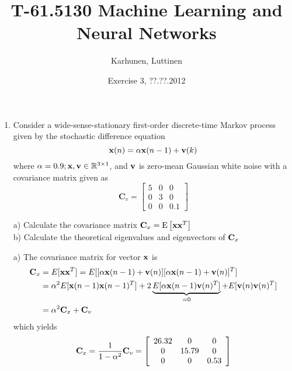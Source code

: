 
\title{T-61.5130 Machine Learning and Neural Networks}
\author{Karhunen, Luttinen}
\date{Exercise 3, ??.??.2012}





\maketitle

\begin{enumerate}
  
\item Consider a wide-sense-stationary
  first-order discrete-time Markov process given by the stochastic
  difference equation
  \[
  {\bf x}(n) = \alpha {\bf x}(n-1) + {\bf v}(k)
  \]
  where $\alpha = 0.9; {\bf x}, {\bf v} \in \mathbb{R}^{3\times 1}$,
  and ${\bf v}$ is zero-mean Gaussian white noise with a covariance
  matrix given as
  \[ \textbf{C}_v = \left[ \begin{array}{ccc}
      5 & 0 & 0 \\
      0 & 3 & 0 \\
      0 & 0 & 0.1 \end{array} \right]\]

  a) Calculate the covariance matrix ${\bf C}_x = \text{E}\left[ {\bf
      xx}^T \right]$\\
  b) Calculate the theoretical eigenvalues and eigenvectors of ${\bf C}_x$

  \begin{solution}

    a) The covariance matrix for vector $\mathbf{x}$ is
    \[
    \begin{split}
      \mathbf{C}_x &=
      E[\mathbf{x} \mathbf{x}^T]=E[[\alpha\mathbf{x}(n-1)+\mathbf{v}(n)][\alpha\mathbf{x}(n-1)+\mathbf{v}(n)]^T]\\
      &=\alpha^2 E[\mathbf{x}(n-1)\mathbf{x}(n-1)^T]+2 \underbrace{E[\alpha \mathbf{x}(n-1)\mathbf{v}(n)^T]}_{=0}+ E[\mathbf{v}(n)\mathbf{v}(n)^T]\\
      &=\alpha^2 \mathbf{C}_x + \mathbf{C}_v
    \end{split}
    \]
    which yields
    \[
    \mathbf{C}_x = \frac{1}{1-\alpha^2}\mathbf{C}_v=
    \left[\begin{array}{ccc}
        26.32 & 0     & 0 \\
        0     & 15.79 & 0 \\
        0     & 0     & 0.53 
      \end{array}\right]
    \]



\end{solution}
\end{enumerate}
